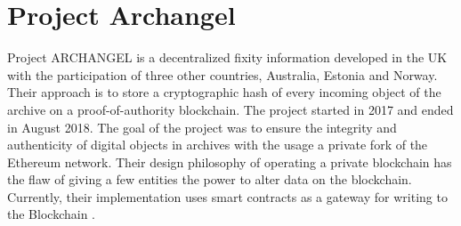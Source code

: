 \section{Project Archangel}
Project ARCHANGEL is a decentralized fixity information developed in the UK with the participation of three other countries, Australia, Estonia and Norway. Their approach is to store a cryptographic hash of every incoming object of the archive on a proof-of-authority blockchain. The project started in 2017 and ended in August 2018. The goal of the project was to ensure the integrity and authenticity of digital objects in archives with the usage a private fork of the Ethereum network. Their design philosophy of operating a private blockchain has the flaw of giving a few entities the power to alter data on the blockchain. Currently, their implementation uses smart contracts as a gateway for writing to the Blockchain \cite[4]{collomosse2018archangel}.

